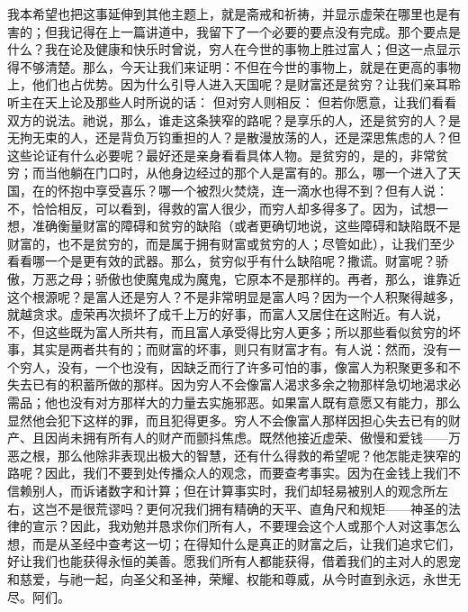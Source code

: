 我本希望也把这事延伸到其他主题上，就是斋戒和祈祷，并显示虚荣在哪里也是有害的；但我记得在上一篇讲道中，我留下了一个必要的要点没有完成。那个要点是什么？我在论及健康和快乐时曾说，穷人在今世的事物上胜过富人；但这一点显示得不够清楚。那么，今天让我们来证明：不但在今世的事物上，就是在更高的事物上，他们也占优势。因为什么引导人进入天国呢？是财富还是贫穷？让我们亲耳聆听主在天上论及那些人时所说的话： 但对穷人则相反： 但若你愿意，让我们看看双方的说法。祂说，那么，谁走这条狭窄的路呢？是享乐的人，还是贫穷的人？是无拘无束的人，还是背负万钧重担的人？是散漫放荡的人，还是深思焦虑的人？但这些论证有什么必要呢？最好还是亲身看看具体人物。是贫穷的，是的，非常贫穷；而当他躺在门口时，从他身边经过的那个人是富有的。那么，哪一个进入了天国，在的怀抱中享受喜乐？哪一个被烈火焚烧，连一滴水也得不到？但有人说：不，恰恰相反，可以看到，得救的富人很少，而穷人却多得多了。因为，试想一想，准确衡量财富的障碍和贫穷的缺陷（或者更确切地说，这些障碍和缺陷既不是财富的，也不是贫穷的，而是属于拥有财富或贫穷的人；尽管如此），让我们至少看看哪一个是更有效的武器。那么，贫穷似乎有什么缺陷呢？撒谎。财富呢？骄傲，万恶之母；骄傲也使魔鬼成为魔鬼，它原本不是那样的。再者，那么，谁靠近这个根源呢？是富人还是穷人？不是非常明显是富人吗？因为一个人积聚得越多，就越贪求。虚荣再次损坏了成千上万的好事，而富人又居住在这附近。有人说，不，但这些既为富人所共有，而且富人承受得比穷人更多；所以那些看似贫穷的坏事，其实是两者共有的；而财富的坏事，则只有财富才有。有人说：然而，没有一个穷人，没有，一个也没有，因缺乏而行了许多可怕的事，像富人为积聚更多和不失去已有的积蓄所做的那样。因为穷人不会像富人渴求多余之物那样急切地渴求必需品；他也没有对方那样大的力量去实施邪恶。如果富人既有意愿又有能力，那么显然他会犯下这样的罪，而且犯得更多。穷人不会像富人那样因担心失去已有的财产、且因尚未拥有所有人的财产而颤抖焦虑。既然他接近虚荣、傲慢和爱钱——万恶之根，那么他除非表现出极大的智慧，还有什么得救的希望呢？他怎能走狭窄的路呢？因此，我们不要到处传播众人的观念，而要查考事实。因为在金钱上我们不信赖别人，而诉诸数字和计算；但在计算事实时，我们却轻易被别人的观念所左右，这岂不是很荒谬吗？更何况我们拥有精确的天平、直角尺和规矩——神圣的法律的宣示？因此，我劝勉并恳求你们所有人，不要理会这个人或那个人对这事怎么想，而是从圣经中查考这一切；在得知什么是真正的财富之后，让我们追求它们，好让我们也能获得永恒的美善。愿我们所有人都能获得，借着我们的主对人的恩宠和慈爱，与祂一起，向圣父和圣神，荣耀、权能和尊威，从今时直到永远，永世无尽。阿们。\par

